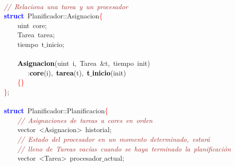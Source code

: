 \mbox{} \\
\mbox{}\textit{\textcolor{Brown}{//\ Relaciona\ una\ tarea\ y\ un\ procesador}} \\
\mbox{}\textbf{\textcolor{Blue}{struct}}\ \textcolor{TealBlue}{Planificador}\textcolor{BrickRed}{::}Asignacion\textcolor{Red}{\{} \\
\mbox{}\ \ \ \ \textcolor{TealBlue}{uint}\ core\textcolor{BrickRed}{;} \\
\mbox{}\ \ \ \ \textcolor{TealBlue}{Tarea}\ tarea\textcolor{BrickRed}{;} \\
\mbox{}\ \ \ \ \textcolor{TealBlue}{tiempo}\ t$\_$inicio\textcolor{BrickRed}{;} \\
\mbox{} \\
\mbox{}\ \ \ \ \textbf{\textcolor{Black}{Asignacion}}\textcolor{BrickRed}{(}\textcolor{TealBlue}{uint}\ i\textcolor{BrickRed}{,}\ \textcolor{TealBlue}{Tarea}\ \textcolor{BrickRed}{\&}t\textcolor{BrickRed}{,}\ \textcolor{TealBlue}{tiempo}\ init\textcolor{BrickRed}{)} \\
\mbox{}\ \ \ \ \ \ \ \textcolor{BrickRed}{:}\textbf{\textcolor{Black}{core}}\textcolor{BrickRed}{(}i\textcolor{BrickRed}{),}\ \textbf{\textcolor{Black}{tarea}}\textcolor{BrickRed}{(}t\textcolor{BrickRed}{),}\ \textbf{\textcolor{Black}{t$\_$inicio}}\textcolor{BrickRed}{(}init\textcolor{BrickRed}{)} \\
\mbox{}\ \ \ \ \textcolor{Red}{\{\}} \\
\mbox{}\textcolor{Red}{\}}\textcolor{BrickRed}{;} \\
\mbox{} \\
\mbox{}\textbf{\textcolor{Blue}{struct}}\ \textcolor{TealBlue}{Planificador}\textcolor{BrickRed}{::}Planificacion\textcolor{Red}{\{} \\
\mbox{}\ \ \ \ \textit{\textcolor{Brown}{//\ Asignaciones\ de\ tareas\ a\ cores\ en\ orden}} \\
\mbox{}\ \ \ \ vector\ \textcolor{BrickRed}{\textless{}}Asignacion\textcolor{BrickRed}{\textgreater{}}\ historial\textcolor{BrickRed}{;} \\
\mbox{}\ \ \ \ \textit{\textcolor{Brown}{//\ Estado\ del\ procesador\ en\ un\ momento\ determinado,\ estará}} \\
\mbox{}\ \ \ \ \textit{\textcolor{Brown}{//\ lleno\ de\ Tareas\ vacías\ cuando\ se\ haya\ terminado\ la\ planificación}} \\
\mbox{}\ \ \ \ vector\ \textcolor{BrickRed}{\textless{}}Tarea\textcolor{BrickRed}{\textgreater{}}\ procesador$\_$actual\textcolor{BrickRed}{;} \\
